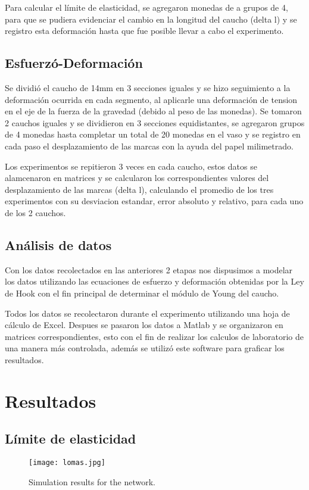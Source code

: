 \documentclass[journal,transmag]{IEEEtran}
\begin{document}
Para calcular el límite de elasticidad, se agregaron monedas de a grupos de 4, para que se pudiera evidenciar el cambio en la longitud del caucho (delta l) y se registro esta deformación hasta que fue posible llevar a cabo el experimento.


\subsection{Esfuerzó-Deformación}
Se dividió el caucho de 14mm en 3 secciones iguales y se hizo seguimiento a la deformación ocurrida en cada segmento, al aplicarle una deformación de tension en el eje de la fuerza de la gravedad (debido al peso de las monedas). Se tomaron 2 cauchos iguales y se dividieron en 3 secciones equidistantes, se agregaron grupos de 4 monedas hasta completar un total de 20 monedas en el vaso y se registro en cada paso el desplazamiento de las marcas con la ayuda del papel milimetrado. 

Los experimentos se repitieron 3 veces en cada caucho, estos datos se alamcenaron en matrices y se calcularon los correspondientes valores del desplazamiento de las marcas (delta l), calculando el promedio de los tres experimentos con su desviacion estandar, error absoluto y relativo, para cada uno de los 2 cauchos.



\subsection{Análisis de datos}

Con los datos recolectados en las anteriores 2 etapas nos dispusimos a modelar los datos utilizando las ecuaciones de esfuerzo y deformación obtenidas por la Ley de Hook con el fin principal de determinar el módulo de Young del caucho.

Todos los datos se recolectaron durante el experimento utilizando una hoja de cálculo de Excel. Despues se pasaron los datos a Matlab y se organizaron en matrices correspondientes, esto con el fin de realizar los calculos de laboratorio de una manera más controlada, además se utilizó  este software para graficar los resultados.

\section{Resultados}
\subsection{Límite de elasticidad}
\begin{figure}[!h]
\center
\texttt{[image: lomas.jpg]}
\caption{Simulation results for the network.}
\label{figr}
\end{figure}
\end{document}
